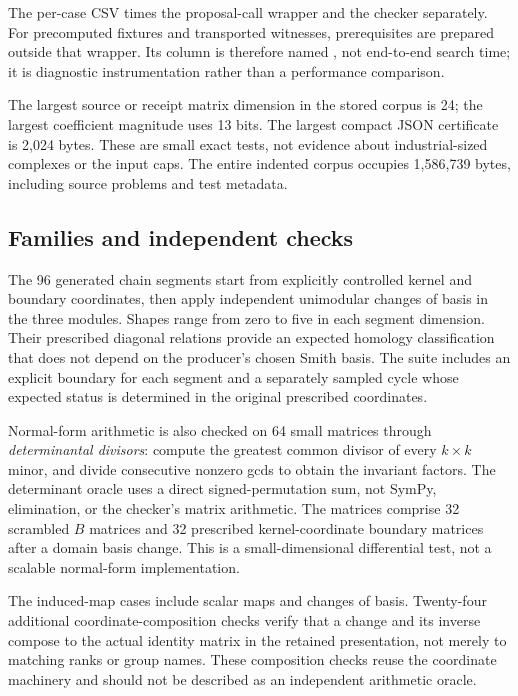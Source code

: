 \documentclass[11pt,letterpaper]{article}
\theoremstyle{definition}\newtheorem{definition}[theorem]{Definition}
\theoremstyle{remark}\newtheorem{remark}[theorem]{Remark}
\newcommand{\code}[1]{\texttt{\detokenize{#1}}}
\begin{document}
The per-case CSV times the proposal-call wrapper and the checker separately.
For precomputed fixtures and transported witnesses, prerequisites are prepared
outside that wrapper. Its column is therefore named
\code{proposal_call_seconds}, not end-to-end search time; it is diagnostic
instrumentation rather than a performance comparison.

The largest source or receipt matrix dimension in the stored corpus is 24; the
largest coefficient magnitude uses 13 bits. The largest compact JSON certificate
is 2,024 bytes. These are small exact tests, not evidence about industrial-sized
complexes or the input caps. The entire indented corpus occupies 1,586,739 bytes,
including source problems and test metadata.

\subsection{Families and independent checks}
The 96 generated chain segments start from explicitly controlled kernel and
boundary coordinates, then apply independent unimodular changes of basis in the
three modules. Shapes range from zero to five in each segment dimension.
Their prescribed diagonal relations provide an expected homology classification
that does not depend on the producer's chosen Smith basis. The suite includes
an explicit boundary for each segment and a separately sampled cycle whose
expected status is determined in the original prescribed coordinates.

Normal-form arithmetic is also checked on 64 small matrices through
\emph{determinantal divisors}: compute the greatest common divisor of every
$k\times k$ minor, and divide consecutive nonzero gcds to obtain the invariant
factors. The determinant oracle uses a direct signed-permutation sum, not
SymPy, elimination, or the checker's matrix arithmetic. The matrices comprise
32 scrambled $B$ matrices and 32 prescribed kernel-coordinate boundary matrices
after a domain basis change. This is a small-dimensional differential test,
not a scalable normal-form implementation.

The induced-map cases include scalar maps and changes of basis. Twenty-four
additional coordinate-composition checks verify that a change and its inverse
compose to the actual identity matrix in the retained presentation, not merely
to matching ranks or group names. These composition checks reuse the
coordinate machinery and should not be described as an independent arithmetic
oracle.
\end{document}
